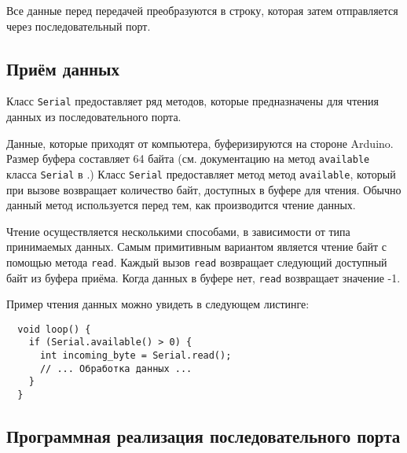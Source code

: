 \documentclass[../sparc.tex]{subfiles}
\begin{document}
Все данные перед передачей преобразуются в строку, которая затем отправляется
через последовательный порт.

\subsection{Приём данных}

Класс \texttt{Serial} предоставляет ряд методов, которые предназначены для
чтения данных из последовательного порта.

Данные, которые приходят от компьютера, буферизируются на стороне Ardu\-ino.
Размер буфера составляет 64 байта (см. документацию на метод \texttt{available}
класса \texttt{Serial} в \cite{arduino:reference}.)  Класс \texttt{Serial}
предоставляет метод метод \texttt{available}, который при вызове возвращает
количество байт, доступных в буфере для чтения.  Обычно данный метод
используется перед тем, как производится чтение данных.

Чтение осуществляется несколькими способами, в зависимости от типа принимаемых
данных.  Самым примитивным вариантом является чтение байт с помощью метода
\texttt{read}.  Каждый вызов \texttt{read} возвращает следующий доступный байт
из буфера приёма.  Когда данных в буфере нет, \texttt{read} возвращает значение
-1.


Пример чтения данных можно увидеть в следующем листинге:

\begin{verbatim}
  void loop() {
    if (Serial.available() > 0) {
      int incoming_byte = Serial.read();
      // ... Обработка данных ...
    }
  }
\end{verbatim}

\subsection{Программная реализация последовательного порта}
\end{document}
